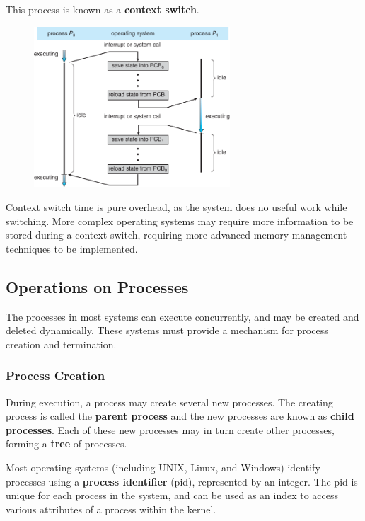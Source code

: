 \documentclass{article}
\begin{document}
This process is known as a \textbf{context switch}.
\begin{figure}[H]
    \centering
    \includegraphics[height = 6cm]{figures/context_switching.pdf}
\end{figure}
Context switch time is pure overhead, as the system does no useful
work while switching.
More complex operating systems may require more information to be
stored during a context switch, requiring more advanced
memory-management techniques to be implemented.
\subsection{Operations on Processes}
The processes in most systems can execute concurrently, and may be
created and deleted dynamically. These systems must provide a mechanism
for process creation and termination.
\subsubsection{Process Creation}
During execution, a process may create several new processes. The
creating process is called the \textbf{parent process} and the new
processes are known as \textbf{child processes}. Each of these new
processes may in turn create other processes, forming a \textbf{tree}
of processes.

Most operating systems (including UNIX, Linux, and Windows) identify
processes using a \textbf{process identifier} (pid), represented by an
integer. The pid is unique for each process in the system, and can be
used as an index to access various attributes of a process within the
kernel.
\end{document}

